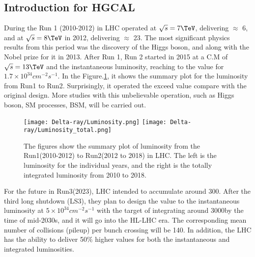 \documentclass[12pt,twoside,a4paper,an,final]{cms-tdr}
\begin{document}
\subsection{Introduction for HGCAL}
During the Run 1 (2010-2012) in LHC operated at $\sqrt{s} = 7\TeV$, delivering $\approx$ 6\fbinv, and at $\sqrt{s} = 8\TeV$ in 2012, delivering $\approx$ 23\fbinv. The most significant physics results from this period was the discovery of the Higgs boson, and along with the Nobel prize for it in 2013. After Run 1, Run 2 started in 2015 at a C.M of $\sqrt{s} = 13\TeV$  and the instantaneous luminosity, reaching to the value for $1.7 \times 10^{34} cm^{-2} s^{-1}$. In the Figure.\ref{luminosity_1}, it shows the summary plot for the luminosity from Run1 to Run2.  Surprisingly, it operated the exceed value compare with the original design. More studies with this unbelievable operation, such as Higgs boson, SM processes, BSM, will be carried out.

\begin{figure}[!htb]
\centering 
     \texttt{[image: Delta-ray/Luminosity.png]}
     \texttt{[image: Delta-ray/Luminosity\_total.png]}
\caption{The figures show the summary plot of luminosity from the Run1(2010-2012) to Run2(2012 to 2018) in LHC. The left is the luminosity for the individual years, and the right is the totally integrated luminosity from 2010 to 2018.}
\label{luminosity_1}
\end{figure}

For the future in Run3(2023), LHC intended to accumulate around 300\fbinv. After the third long shutdown (LS3), they plan to design the value to the instantaneous luminosity at $5 \times 10^{34} cm^{-2} s^{-1}$ with the target of integrating around 3000\fbinv by the time of mid-2030s, and it will go into the HL-LHC era. The corresponding mean number of collisions (pileup) per bunch crossing will be 140. In addition, the LHC has the ability to deliver 50\% higher values for both the instantaneous and integrated luminosities.
\end{document}
